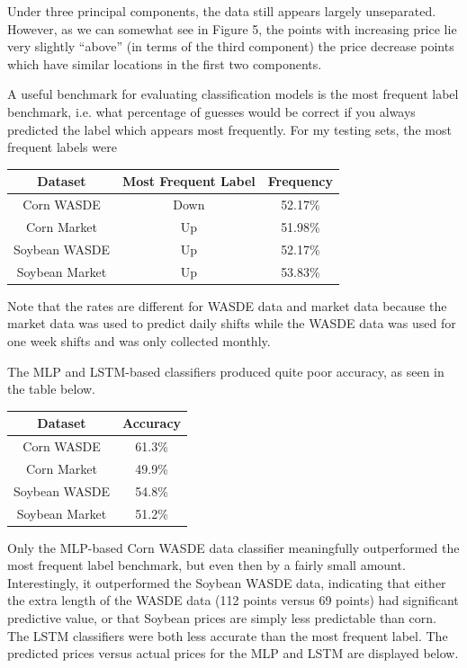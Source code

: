 \documentclass{article}
\begin{document}
Under three principal components, the data still appears largely unseparated.  However, as we can somewhat see in Figure 5, the points with increasing price lie very slightly ``above'' (in terms of the third component) the price decrease points which have similar locations in the first two components.  

A useful benchmark for evaluating classification models is the most frequent label benchmark, i.e. what percentage of guesses would be correct if you always predicted the label which appears most frequently.  For my testing sets, the most frequent labels were
\begin{center}
\begin{tabular}{|c|c|c|}
\hline
Dataset & Most Frequent Label & Frequency\\
\hline
Corn WASDE & Down & 52.17\%\\
Corn Market & Up & 51.98\%\\
Soybean WASDE & Up & 52.17\%\\
Soybean Market & Up & 53.83\%\\
\hline
\end{tabular}
\end{center}
Note that the rates are different for WASDE data and market data because the market data was used to predict daily shifts while the WASDE data was used for one week shifts and was only collected monthly.


The MLP and LSTM-based classifiers produced quite poor accuracy, as seen in the table below.
\begin{center}
\begin{tabular}{|c|c|}
\hline
Dataset & Accuracy\\
\hline
Corn WASDE & 61.3\%\\
Corn Market & 49.9\%\\
Soybean WASDE & 54.8\%\\
Soybean Market & 51.2\%\\
\hline
\end{tabular}
\end{center}

Only the MLP-based Corn WASDE data classifier meaningfully outperformed the most frequent label benchmark, but even then by a fairly small amount.  Interestingly, it outperformed the Soybean WASDE data, indicating that either the extra length of the WASDE data (112 points versus 69 points) had significant predictive value, or that Soybean prices are simply less predictable than corn.  The LSTM classifiers were both less accurate than the most frequent label.  The predicted prices versus actual prices for the MLP and LSTM are displayed below.
\end{document}
